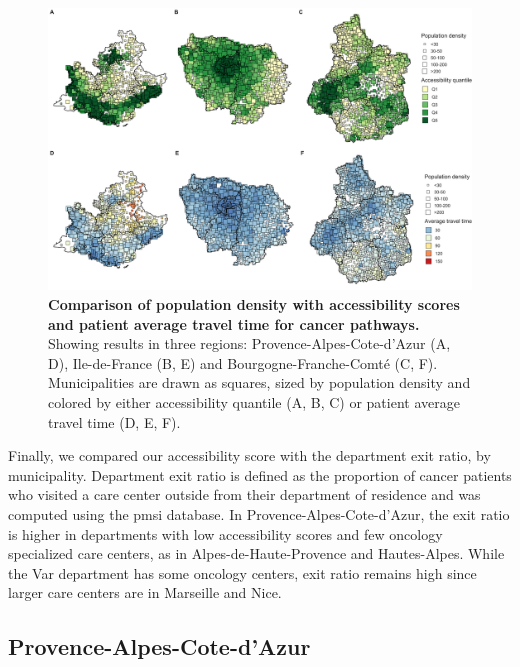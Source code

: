 \begin{figure}[H]
    \includegraphics[width=\textwidth]{images/camion/fig3_accessibility_vs_density_scatter_map.png}
    \centering
    \caption{
        \textbf{Comparison of population density with accessibility scores and patient average travel time for cancer pathways.} Showing results in three regions: Provence-Alpes-Cote-d’Azur (A, D), Ile-de-France (B, E) and Bourgogne-Franche-Comté (C, F). Municipalities are drawn as squares, sized by population density and colored by either accessibility quantile (A, B, C) or patient average travel time (D, E, F).
    }
    \label{fig:accessibility-vs-density}
\end{figure}

Finally, we compared our accessibility score with the department exit ratio, by municipality. Department exit ratio is defined as the proportion of cancer patients who visited a care center outside from their department of residence and was computed using the \ac{pmsi} database. In Provence-Alpes-Cote-d'Azur, the exit ratio is higher in departments with low accessibility scores and few oncology specialized care centers, as in Alpes-de-Haute-Provence and Hautes-Alpes. While the Var department has some oncology centers, exit ratio remains high since larger care centers are in Marseille and Nice.

\subsection*{Provence-Alpes-Cote-d'Azur}

